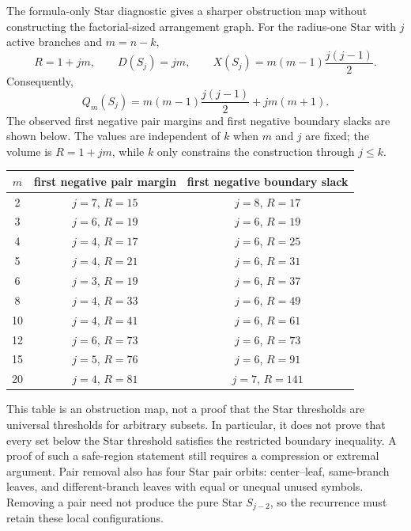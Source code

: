 \begin{remark}
The formula-only Star diagnostic gives a sharper obstruction map without
constructing the factorial-sized arrangement graph.  For the radius-one Star
with $j$ active branches and $m=n-k$,
\begin{equation}
 R=1+jm,\qquad D(S_j)=jm,\qquad
 X(S_j)=m(m-1)\frac{j(j-1)}{2}.
\end{equation}
Consequently,
\begin{equation}
 Q_m(S_j)=m(m-1)\frac{j(j-1)}{2}+jm(m+1).
\end{equation}
The observed first negative pair margins and first negative boundary slacks are
shown below.  The values are independent of $k$ when $m$ and $j$ are fixed;
the volume is $R=1+jm$, while $k$ only constrains the construction through
$j\le k$.

\begin{center}
\begin{tabular}{c|c|c}
 $m$ & first negative pair margin & first negative boundary slack \\
 \hline
 2 & $j=7$, $R=15$ & $j=8$, $R=17$ \\
 3 & $j=6$, $R=19$ & $j=6$, $R=19$ \\
 4 & $j=4$, $R=17$ & $j=6$, $R=25$ \\
 5 & $j=4$, $R=21$ & $j=6$, $R=31$ \\
 6 & $j=3$, $R=19$ & $j=6$, $R=37$ \\
 8 & $j=4$, $R=33$ & $j=6$, $R=49$ \\
 10 & $j=4$, $R=41$ & $j=6$, $R=61$ \\
 12 & $j=6$, $R=73$ & $j=6$, $R=73$ \\
 15 & $j=5$, $R=76$ & $j=6$, $R=91$ \\
 20 & $j=4$, $R=81$ & $j=7$, $R=141$ \\
\end{tabular}
\end{center}

This table is an obstruction map, not a proof that the Star thresholds are
universal thresholds for arbitrary subsets.  In particular, it does not prove
that every set below the Star threshold satisfies the restricted boundary
inequality.  A proof of such a safe-region statement still requires a
compression or extremal argument.  Pair removal also has four Star pair
orbits: center--leaf, same-branch leaves, and different-branch leaves with
equal or unequal unused symbols.  Removing a pair need not produce the pure
Star $S_{j-2}$, so the recurrence must retain these local configurations.
\end{remark}

